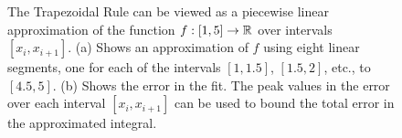 \begin{figure}[htb]%
\centering
{}%
\hspace{5pt}%
%
    \caption[]{The Trapezoidal Rule can be viewed as a piecewise linear approximation of the function $f:[1, 5] \to \mathbb R$ over intervals $[x_i, x_{i+1}]$.  (a) Shows an approximation of $f$ using eight linear segments, one for each of the intervals $[1, 1.5]$,  $[1.5, 2]$, etc., to $[4.5, 5]$. (b) Shows the error in the fit. The peak values in the error over each interval $[x_i, x_{i+1}]$ can be used to bound the total error in the approximated integral.}
    \label{fig:PiecewiseLinear Approximation}
\end{figure}

